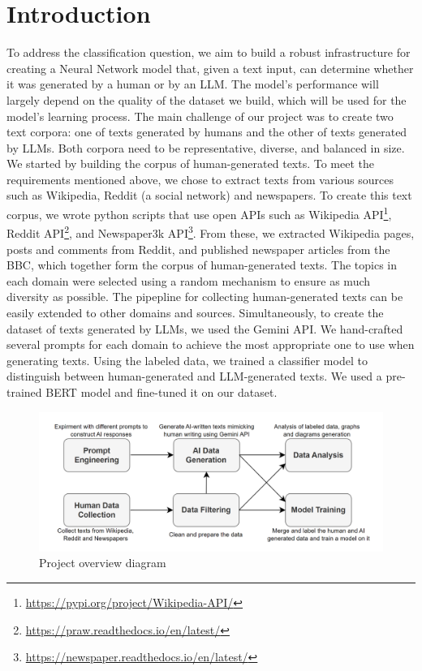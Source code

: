 \documentclass[11pt]{article}
\begin{document}
\section{Introduction}
To address the classification question, we aim to build a robust infrastructure for creating a Neural Network model that, given a text input, can determine whether it was generated by a human or by an LLM. The model's performance will largely depend on the quality of the dataset we build, which will be used for the model's learning process.
The main challenge of our project was to create two text corpora: one of texts generated by humans and the other of texts generated by LLMs. Both corpora need to be representative, diverse, and balanced in size.
We started by building the corpus of human-generated texts. To meet the requirements mentioned above, we chose to extract texts from various sources such as Wikipedia, Reddit (a social network) and newspapers.
To create this text corpus, we wrote python scripts that use open APIs such as Wikipedia API\footnote{\url{https://pypi.org/project/Wikipedia-API/}}, Reddit API\footnote{\url{https://praw.readthedocs.io/en/latest/}}, and Newspaper3k API\footnote{\url{https://newspaper.readthedocs.io/en/latest/}}. From these, we extracted Wikipedia pages, posts and comments from Reddit, and published newspaper articles from the BBC, which together form the corpus of human-generated texts. The topics in each domain were selected using a random mechanism to ensure as much diversity as possible. The pipepline for collecting human-generated texts can be easily extended to other domains and sources.
Simultaneously, to create the dataset of texts generated by LLMs, we used the Gemini API. We hand-crafted several prompts for each domain to achieve the most appropriate one to use when generating texts.
Using the labeled data, we trained a classifier model to distinguish between human-generated and LLM-generated texts. We used a pre-trained BERT model and fine-tuned it on our dataset.

\begin{figure}[tp]
  \centering
  \includegraphics[width=\textwidth]{overview_diagram.png}
  \caption{Project overview diagram}
  \label{fig:pipeline}
\end{figure}
\end{document}
